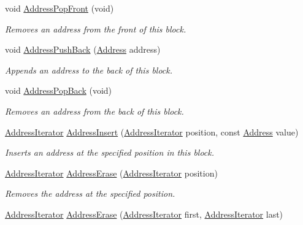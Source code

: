 \begin{DoxyCompactItemize}
void \hyperlink{classns3_1_1PbbAddressBlock_a742b8e571d0afcfbe5e80c4af9d9af7c}{Address\+Pop\+Front} (void)
\begin{DoxyCompactList}\small\item\em Removes an address from the front of this block. \end{DoxyCompactList}\item 
void \hyperlink{classns3_1_1PbbAddressBlock_a7be545a53d69bd426dbebcf752ed8371}{Address\+Push\+Back} (\hyperlink{classns3_1_1Address}{Address} address)
\begin{DoxyCompactList}\small\item\em Appends an address to the back of this block. \end{DoxyCompactList}\item 
void \hyperlink{classns3_1_1PbbAddressBlock_af1c33848a807cbd9b619887426aa5a56}{Address\+Pop\+Back} (void)
\begin{DoxyCompactList}\small\item\em Removes an address from the back of this block. \end{DoxyCompactList}\item 
\hyperlink{classns3_1_1PbbAddressBlock_a17f626a1684a378dae2bdf678b042e37}{Address\+Iterator} \hyperlink{classns3_1_1PbbAddressBlock_a52c7ec0adf4f88a96cb2d9dd6fbe382b}{Address\+Insert} (\hyperlink{classns3_1_1PbbAddressBlock_a17f626a1684a378dae2bdf678b042e37}{Address\+Iterator} position, const \hyperlink{classns3_1_1Address}{Address} value)
\begin{DoxyCompactList}\small\item\em Inserts an address at the specified position in this block. \end{DoxyCompactList}\item 
\hyperlink{classns3_1_1PbbAddressBlock_a17f626a1684a378dae2bdf678b042e37}{Address\+Iterator} \hyperlink{classns3_1_1PbbAddressBlock_a83e133a338ddc0b8e04e589ebce9f5a8}{Address\+Erase} (\hyperlink{classns3_1_1PbbAddressBlock_a17f626a1684a378dae2bdf678b042e37}{Address\+Iterator} position)
\begin{DoxyCompactList}\small\item\em Removes the address at the specified position. \end{DoxyCompactList}\item 
\hyperlink{classns3_1_1PbbAddressBlock_a17f626a1684a378dae2bdf678b042e37}{Address\+Iterator} \hyperlink{classns3_1_1PbbAddressBlock_a4a36fa27f2365f70c9e73cfc198df6c9}{Address\+Erase} (\hyperlink{classns3_1_1PbbAddressBlock_a17f626a1684a378dae2bdf678b042e37}{Address\+Iterator} first, \hyperlink{classns3_1_1PbbAddressBlock_a17f626a1684a378dae2bdf678b042e37}{Address\+Iterator} last)

\end{DoxyCompactItemize}
